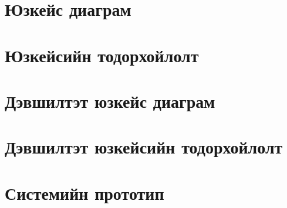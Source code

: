 \section{Юзкейс диаграм}
\section{Юзкейсийн тодорхойлолт}
\section{Дэвшилтэт юзкейс диаграм}
\section{Дэвшилтэт юзкейсийн тодорхойлолт}
\section{Системийн прототип}
